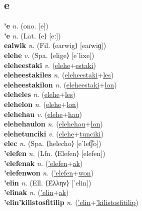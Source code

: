 \subsection{e}

\textbf{'e} \textit{n.} (ono. [e])
 \label{'e} \\
\textbf{'e} \textit{n.} (Lat. ⟨e⟩ [eː])
 \label{'e} \\
\textbf{ealwik} \textit{n.} (Fil. ⟨earwig⟩ [eaɾwiɡ])
 \label{ealwik} \\
\textbf{elehe} \textit{v.} (Spa. ⟨elige⟩ [eˈlixe])
 \label{elehe} \\
\textbf{eleheestaki} \textit{v.} (\hyperref[elehe]{elehe}+\hyperref[estaki]{estaki})
 \label{eleheestaki} \\
\textbf{eleheestakiles} \textit{n.} (\hyperref[eleheestaki]{eleheestaki}+\hyperref[les]{les})
 \label{eleheestakiles} \\
\textbf{eleheestakilon} \textit{n.} (\hyperref[eleheestaki]{eleheestaki}+\hyperref[lon]{lon})
 \label{eleheestakilon} \\
\textbf{eleheles} \textit{n.} (\hyperref[elehe]{elehe}+\hyperref[les]{les})
 \label{eleheles} \\
\textbf{elehelon} \textit{n.} (\hyperref[elehe]{elehe}+\hyperref[lon]{lon})
 \label{elehelon} \\
\textbf{elehehau} \textit{v.} (\hyperref[elehe]{elehe}+\hyperref[hau]{hau})
 \label{elehehau} \\
\textbf{elehehaulon} \textit{n.} (\hyperref[elehehau]{elehehau}+\hyperref[lon]{lon})
 \label{elehehaulon} \\
\textbf{elehetunciki} \textit{v.} (\hyperref[elehe]{elehe}+\hyperref[tunciki]{tunciki})
 \label{elehetunciki} \\
\textbf{elec} \textit{n.} (Spa. ⟨helecho⟩ [eˈlet͡ʃo])
 \label{elec} \\
\textbf{'elefen} \textit{n.} (Lfn. ⟨Elefen⟩ [elefen])
 \label{'elefen} \\
\textbf{'elefenak} \textit{n.} (\hyperref['elefen]{'elefen}+\hyperref[ak]{ak})
 \label{'elefenak} \\
\textbf{'elefenwon} \textit{n.} (\hyperref['elefen]{'elefen}+\hyperref[won]{won})
 \label{'elefenwon} \\
\textbf{'elin} \textit{n.} (Ell. ⟨Έλλην⟩ [ˈelin])
 \label{'elin} \\
\textbf{'elinak} \textit{n.} (\hyperref['elin]{'elin}+\hyperref[ak]{ak})
 \label{'elinak} \\
\textbf{'elin'kilistosfitilip} \textit{n.} (\hyperref['elin]{'elin}+\hyperref['kilistosfitilip]{'kilistosfitilip})
